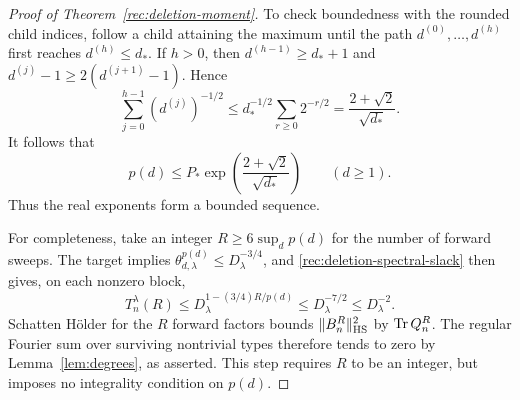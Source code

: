 \begin{proof}[Proof of Theorem~\ref{rec:deletion-moment}]
To check boundedness with the rounded child indices, follow a child
attaining the maximum until the path $d^{(0)},\ldots,d^{(h)}$ first
reaches $d^{(h)}\le d_*$. If $h>0$, then
$d^{(h-1)}\ge d_*+1$ and
$d^{(j)}-1\ge2(d^{(j+1)}-1)$. Hence
\[
 \sum_{j=0}^{h-1}(d^{(j)})^{-1/2}
 \le d_*^{-1/2}\sum_{r\ge0}2^{-r/2}
 =\frac{2+\sqrt2}{\sqrt{d_*}}.
\]
It follows that
\[
 p(d)\le P_*\exp\left(\frac{2+\sqrt2}{\sqrt{d_*}}\right)
 \qquad(d\ge1).
\]
Thus the real exponents form a bounded sequence.

For completeness, take an integer $R\ge6\sup_dp(d)$ for the number
of forward sweeps. The target implies
$\theta_{d,\lambda}^{p(d)}\le D_\lambda^{-3/4}$, and
\eqref{rec:deletion-spectral-slack} then gives, on each nonzero block,
\[
 T_n^\lambda(R)
 \le D_\lambda^{1-(3/4)R/p(d)}
 \le D_\lambda^{-7/2}\le D_\lambda^{-2}.
\]
Schatten H\"older for the $R$ forward factors bounds
$\|B_n^R\|_{\mathrm{HS}}^2$ by $\operatorname{Tr} Q_n^R$. The regular Fourier sum over
surviving nontrivial types therefore tends to zero by
Lemma~\ref{lem:degrees}, as asserted. This step requires $R$ to be
an integer, but imposes no integrality condition on $p(d)$.
\end{proof}
